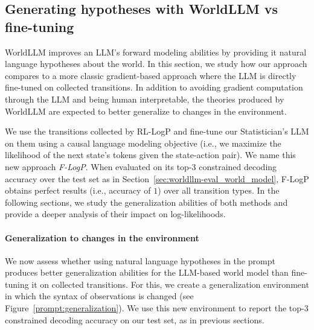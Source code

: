 \documentclass{article}
\begin{document}
\subsection{Generating hypotheses with WorldLLM vs fine-tuning}
WorldLLM improves an LLM's forward modeling abilities by providing it natural language hypotheses about the world. In this section, we study how our approach compares to a more classic gradient-based approach where the LLM is directly fine-tuned on collected transitions. In addition to avoiding gradient computation through the LLM and being human interpretable, the theories produced by WorldLLM are expected to better generalize to changes in the environment.  

We use the transitions collected by RL-LogP and fine-tune our Statistician's LLM on them using a causal language modeling objective (i.e., we maximize the likelihood of the next state's tokens given the state-action pair). We name this new approach \textit{F-LogP}. When evaluated on its top-3 constrained decoding accuracy over the test set as in Section~\ref{sec:worldllm-eval_world_model}, F-LogP obtains perfect results (i.e., accuracy of $1$) over all transition types.  In the following sections, we study the generalization abilities of both methods and provide a deeper analysis of their impact on log-likelihoods.

\paragraph{Generalization to changes in the environment} \label{sec:worldllm-generalization}
We now assess whether using natural language hypotheses in the prompt produces better generalization abilities for the LLM-based world model than fine-tuning it on collected transitions. For this, we create a generalization environment in which the syntax of observations is changed (see Figure~\ref{prompt:generalization}). We use this new environment to report the top-3 constrained decoding accuracy on our test set, as in previous sections.
\end{document}
